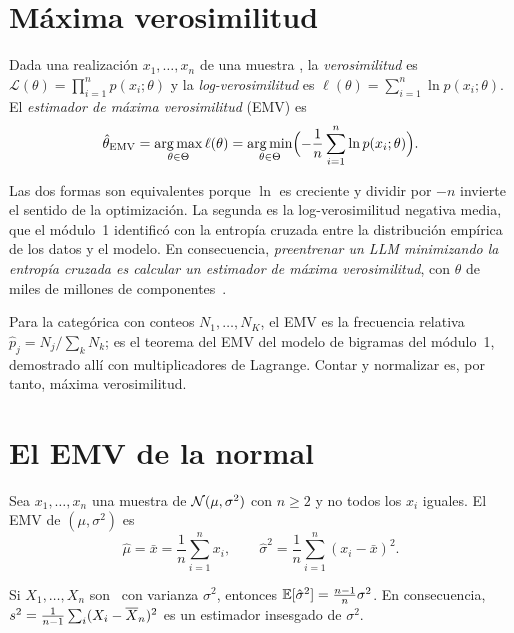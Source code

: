 \section{Máxima verosimilitud}

\begin{definicion}\label{def:emv}
Dada una realización $x_1,\dots,x_n$ de una muestra \iid, la \emph{verosimilitud} es $\mathcal{L}(\theta)=\prod_{i=1}^{n}p(x_i;\theta)$ y la \emph{log-verosimilitud} es $\ell(\theta)=\sum_{i=1}^{n}\ln p(x_i;\theta)$. El \emph{estimador de máxima verosimilitud} (EMV) es
\[
\hat\theta_{\mathrm{EMV}}=\operatorname*{arg\,max}_{\theta\in\Theta}\ell(\theta)=\operatorname*{arg\,min}_{\theta\in\Theta}\Bigl(-\frac1n\sum_{i=1}^{n}\ln p(x_i;\theta)\Bigr).
\]
\end{definicion}

Las dos formas son equivalentes porque $\ln$ es creciente y dividir por $-n$ invierte el sentido de la optimización. La segunda es la log-verosimilitud negativa media, que el módulo~1 identificó con la entropía cruzada entre la distribución empírica de los datos y el modelo. En consecuencia, \emph{preentrenar un LLM minimizando la entropía cruzada es calcular un estimador de máxima verosimilitud}, con $\theta$ de miles de millones de componentes~\cite[§8.3]{mml}.

\addtocounter{definicion}{1}%

Para la categórica con conteos $N_1,\dots,N_K$, el EMV es la frecuencia relativa $\hat p_j=N_j/\sum_k N_k$; es el teorema del EMV del modelo de bigramas del módulo~1, demostrado allí con multiplicadores de Lagrange. Contar y normalizar es, por tanto, máxima verosimilitud.

\section{El EMV de la normal}

\begin{teorema}\label{teo:emv-normal}
Sea $x_1,\dots,x_n$ una muestra de $\mathcal{N}(\mu,\sigma^{2})$ con $n\ge 2$ y no todos los $x_i$ iguales. El EMV de $(\mu,\sigma^{2})$ es
\[
\hat\mu=\bar x=\frac1n\sum_{i=1}^{n}x_i,\qquad \hat\sigma^{2}=\frac1n\sum_{i=1}^{n}(x_i-\bar x)^{2}.
\]
\end{teorema}

\addtocounter{definicion}{1}%

\begin{proposicion}\label{prop:sesgo}
Si $X_1,\dots,X_n$ son \iid\ con varianza $\sigma^{2}$, entonces $\mathbb{E}[\hat\sigma^{2}]=\frac{n-1}{n}\sigma^{2}$. En consecuencia, $s^{2}=\frac{1}{n-1}\sum_i(X_i-\overline{X}_n)^{2}$ es un estimador insesgado de $\sigma^{2}$.
\end{proposicion}

